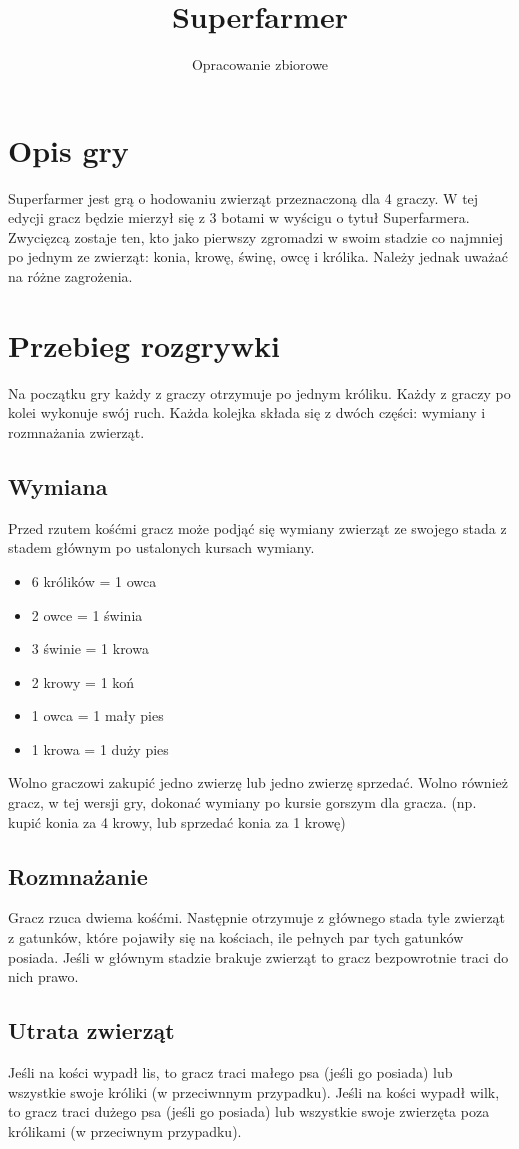 \documentclass{article}
\title{Superfarmer}
\author{Opracowanie zbiorowe}
\begin{document}
\maketitle

\section{Opis gry}
Superfarmer jest grą o hodowaniu zwierząt przeznaczoną dla 4 graczy. W tej edycji gracz będzie mierzył się z 3 botami w wyścigu o tytuł Superfarmera. Zwycięzcą zostaje ten, kto jako pierwszy zgromadzi w swoim stadzie co najmniej po jednym ze zwierząt: konia, krowę, świnę, owcę i królika. Należy jednak uważać na różne zagrożenia.


\section{Przebieg rozgrywki}
Na początku gry każdy z graczy otrzymuje po jednym króliku.
Każdy z graczy po kolei wykonuje swój ruch. Każda kolejka składa się z dwóch części: wymiany i rozmnażania zwierząt.
\subsection{Wymiana}
Przed rzutem kośćmi gracz może podjąć się wymiany zwierząt ze swojego stada z stadem głównym po ustalonych kursach wymiany.
\begin{itemize}
  \item 6 królików = 1 owca
  \item 2 owce = 1 świnia
  \item 3 świnie = 1 krowa
  \item 2 krowy = 1 koń
  \item 1 owca = 1 mały pies
  \item 1 krowa = 1 duży pies
\end{itemize}


Wolno graczowi zakupić jedno zwierzę lub jedno zwierzę sprzedać.
Wolno również gracz, w tej wersji gry, dokonać wymiany po kursie gorszym dla gracza. (np. kupić konia za 4 krowy, lub sprzedać konia za 1 krowę)
\subsection{Rozmnażanie}
Gracz rzuca dwiema kośćmi. Następnie otrzymuje z głównego stada tyle zwierząt z gatunków, które pojawiły się na kościach, ile pełnych par tych gatunków posiada. Jeśli w głównym stadzie brakuje zwierząt to gracz bezpowrotnie traci do nich prawo.
\subsection{Utrata zwierząt}
Jeśli na kości wypadł lis, to gracz traci małego psa (jeśli go posiada) lub wszystkie swoje króliki (w przeciwnnym przypadku).
Jeśli na kości wypadł wilk, to gracz traci dużego psa (jeśli go posiada) lub wszystkie swoje zwierzęta poza królikami (w przeciwnym przypadku).




\end{document}
